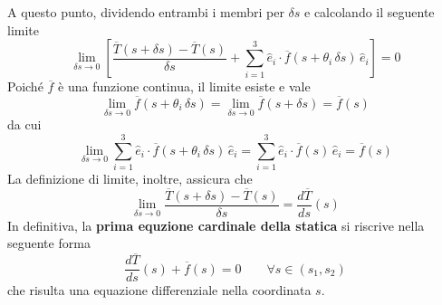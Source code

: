 A questo punto, dividendo entrambi i membri per $\delta s$ e calcolando il seguente limite
\[
\lim_{\delta s\to 0} \left[ \dfrac{\overline{T}(s+\delta s)-\overline{T}(s)}{\delta s} + \sum_{i=1}^3 \hat{e}_i\cdot \overline{f}(s+\theta_i\,\delta s)\,\hat{e}_i \right] = 0
\]
Poiché $\overline{f}$ è una funzione continua, il limite esiste e vale
\[
\lim_{\delta s \to 0} \overline{f}(s+\theta_i\,\delta s) = \lim_{\delta s \to 0} \overline{f}(s+\delta s) = \overline{f}(s)
\]
da cui
\[
\lim_{\delta s \to 0} \sum_{i=1}^3 \hat{e}_i\cdot \overline{f}(s+\theta_i\,\delta s)\,\hat{e}_i = \sum_{i=1}^3 \hat{e}_i\cdot \overline{f}(s)\,\hat{e}_i = \overline{f}(s)
\]
La definizione di limite, inoltre, assicura che
\[
\lim_{\delta s \to 0} \dfrac{\overline{T}(s+\delta s)-\overline{T}(s)}{\delta s} = \dfrac{d\overline{T}}{ds}(s)
\]
In definitiva, la \textbf{prima equzione cardinale della statica} si riscrive nella seguente forma
\begin{equation}
\label{eq:prima_eq_cardinale_statica}
\dfrac{d\overline{T}}{ds}(s) + \overline{f}(s) = 0\qquad \forall s \in (s_1, s_2)
\end{equation}
che risulta una equazione differenziale nella coordinata $s$.

